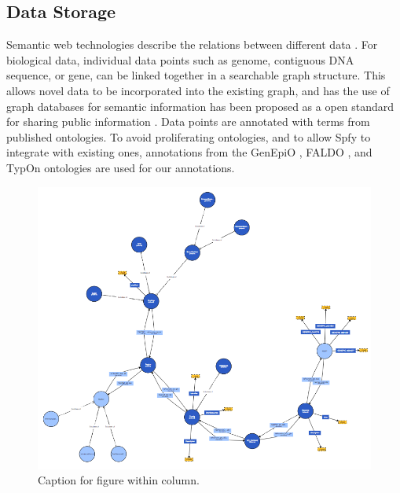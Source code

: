 \documentclass{article}
\begin{document}
\subsection{Data Storage}
Semantic web technologies describe the relations between different data \cite{berners2001semantic}. For biological data, individual data points such as genome, contiguous DNA sequence, or gene, can be linked together in a searchable graph structure. This allows novel data to be incorporated into the existing graph, and has the use of graph databases for semantic information has been proposed as a open standard for sharing public information \cite{horrocks2005semantic}. Data points are annotated with terms from published ontologies. To avoid proliferating ontologies, and to allow Spfy to integrate with existing ones, annotations from the GenEpiO \cite{griffiths2017context}, FALDO \cite{bolleman2016faldo}, and TypOn \cite{vaz2014typon} ontologies are used for our annotations.

\begin{figure}[!hb]
\begin{center}
\includegraphics[width=\textwidth]{images/ontology}
\end{center}
\caption{Caption for figure within column.}
\label{fig-ontology}
\end{figure}
\end{document}

